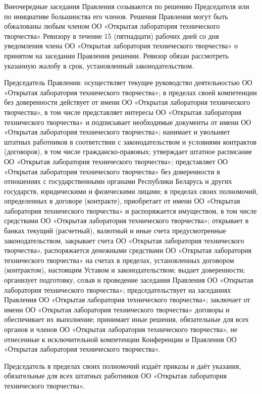\documentclass[a4paper,14pt,titlepage]{extarticle}
\begin{document}
Внеочередные заседания Правления созываются по решению Председателя или по инициативе большинства его членов.
Решения Правления могут быть обжалованы любым членом ОО «Открытая лаборатория технического творчества» Ревизору в
течение 15 (пятнадцати) рабочих дней со дня уведомления члена ОО «Открытая лаборатория технического творчества» о
принятом на заседании Правления решении. Ревизор обязан рассмотреть указанную жалобу в срок, установленный
законодательством. 

Председатель Правления:
осуществляет текущее руководство деятельностью ОО «Открытая лаборатория технического творчества»;
в пределах своей компетенции без доверенности действует от имени ОО «Открытая лаборатория технического творчества», в
том числе представляет интересы ОО «Открытая лаборатория технического творчества» и подписывает необходимые документы от
имени ОО «Открытая лаборатория технического творчества»;
нанимает и увольняет штатных работников в соответствии с законодательством и условиями контрактов (договоров), в том
числе гражданско-правовых; утверждает штатное расписание ОО «Открытая лаборатория технического творчества»;
представляет ОО «Открытая лаборатория технического творчества» без доверенности в отношениях с государственными органами
Республики Беларусь и других государств, юридическими и физическими лицами;
в пределах своих полномочий, определенных в договоре (контракте), приобретает от имени ОО «Открытая лаборатория
технического творчества» и распоряжается имуществом, в том числе средствами ОО «Открытая лаборатория технического
творчества»;
открывает в банках текущий (расчетный), валютный и иные счета предусмотренные законодательством, закрывает счета ОО
«Открытая лаборатория технического творчества», распоряжается денежными средствами ОО «Открытая лаборатория технического
творчества» на счетах в пределах, установленных договором (контрактом), настоящим Уставом и законодательством;
выдает доверенности;
организует подготовку, созыв и проведение заседания Правления ОО «Открытая лаборатория технического творчества»;
председательствует на заседаниях Правления ОО «Открытая лаборатория технического творчества»;
заключает от имени ОО «Открытая лаборатория технического творчества» договоры и обеспечивает их выполнение;
принимает иные решения, обязательные для всех органов и членов ОО «Открытая лаборатория технического творчества», не
отнесенные к исключительной компетенции Конференции и Правления ОО «Открытая лаборатория технического творчества».

Председатель в пределах своих полномочий издаёт приказы и даёт указания, обязательные для всех штатных работников ОО
«Открытая лаборатория технического творчества».
\end{document}
